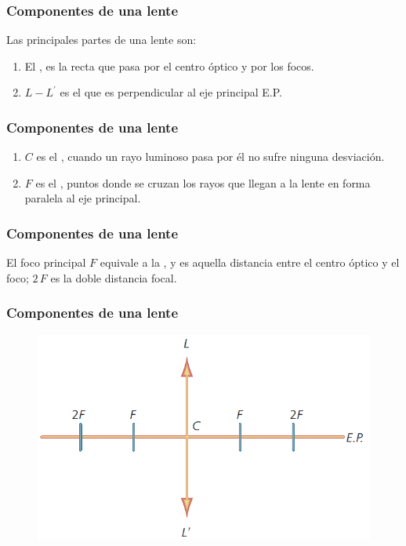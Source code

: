 \documentclass[14pt]{beamer}
\begin{document}
\begin{frame}
\frametitle{Componentes de una lente}
Las principales partes de una lente son:
\pause
{}
\begin{enumerate}[<+->]
\item El  , es la recta que pasa por el centro óptico y por los focos.
\item $L - L^{\prime}$ es el  que es perpendicular al eje principal E.P.
\seti
\end{enumerate}
\end{frame}
\begin{frame}
\frametitle{Componentes de una lente}
\begin{enumerate}[<+->]
\conti
\item $C$ es el , cuando un rayo luminoso pasa por él no sufre ninguna desviación.
\item $F$ es el , puntos donde se cruzan los rayos que llegan a la lente en forma paralela al eje principal.
\end{enumerate}
\end{frame}
\begin{frame}
\frametitle{Componentes de una lente}
El foco principal $F$ equivale a la , y es aquella distancia entre el centro óptico y el foco; \pause $2 \, F$ es la doble distancia focal.
\end{frame}
\begin{frame}
\frametitle{Componentes de una lente}
\begin{figure}
    \centering
    \includegraphics[scale=0.55]{Imagenes/Lentes_01.png}
\end{figure}
\end{frame}
\end{document}
